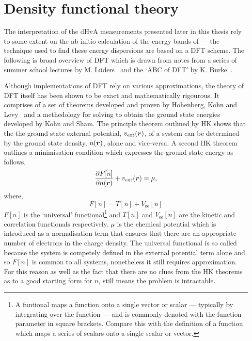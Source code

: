 
\section{Density functional theory}
\label{Sec:Theo:Dft}

The interpretation of the \ac{dHvA} measurements presented later in this thesis rely to some extent on the ab-initio calculation of the energy bands of \BaFeP --- the technique used to find these energy dispersions are based on a \ac{DFT} scheme. The following is broad overview of \ac{DFT} which is drawn from notes from a series of summer school lectures by M. L\"uders~\cite{Luders2010} and the `ABC of DFT' by K. Burke~\cite{Burke2003}.

 Although implementations of \ac{DFT} rely on various approximations, the theory of \ac{DFT} itself has been shown to be exact and mathematically rigourous. It comprises of a set of theorems developed and proven by Hohenberg, Kohn and Levy~\cite{Hohenberg1964, Levy1979} and a methedology for solving to obtain the ground state energies developed by Kohn and Sham. The principle theorem outlined by \ac{HK} shows that the the ground state external potential, $v_{\textrm{ext}}(\boldsymbol{r})$, of a system can be determined by the ground state density, $n(\boldsymbol{r})$, alone and vice-versa. A second \ac{HK} theorem outlines a minimisation condition which expresses the ground state energy as follows,
\begin{equation}
\label{Eqn:Theo:HKMinimisation}
\frac{\partial F[n]}{\partial n(\boldsymbol{r})} + v_{\textrm{ext}}(\boldsymbol{r}) = \mu,
\end{equation}
where,
\begin{equation}
F[n] = T[n] + V_{\textrm{ee}}[n]
\end{equation}
$F[n]$ is the `universal' functional\footnote{A funtional maps a function onto a single vector or scalar --- typically by integrating over the function --- and is commonly denoted with the function parameter in square brackets. Compare this with the definition of a function which maps a series of scalars onto a single scalar or vector.} and $T[n]$ and $V_{\textrm{ee}}[n]$ are the kinetic and correlation functionals respectively. $\mu$ is the chemical potential which is introduced as a normalisation term that ensures that there are an appropriate number of electrons in the charge density. The universal functional is so called because the system is competely defined in the external potential term alone and so $F[n]$ is common to all systems, nonetheless it still requires approximation. For this reason as well as the fact that there are no clues from the \ac{HK} theorems as to a good starting form for $n$, still means the problem is intractable.

